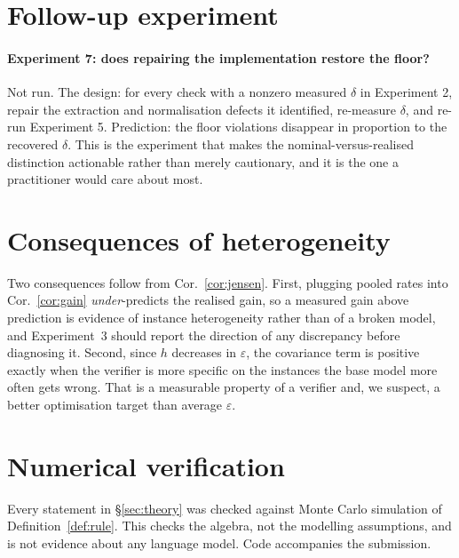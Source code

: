 \documentclass[11pt]{article}
\begin{document}
\section{Follow-up experiment}\label{app:e7}
\paragraph{Experiment 7: does repairing the implementation restore the floor?} Not run. The design: for every check with a nonzero measured $\delta$ in Experiment 2, repair the extraction and normalisation defects it identified, re-measure $\delta$, and re-run Experiment 5. Prediction: the floor violations disappear in proportion to the recovered $\delta$. This is the experiment that makes the nominal-versus-realised distinction actionable rather than merely cautionary, and it is the one a practitioner would care about most.

\section{Consequences of heterogeneity}\label{app:hetdisc}
Two consequences follow from Cor.~\ref{cor:jensen}. First, plugging pooled rates into Cor.~\ref{cor:gain} \emph{under}-predicts the realised gain, so a measured gain above prediction is evidence of instance heterogeneity rather than of a broken model, and Experiment~3 should report the direction of any discrepancy before diagnosing it. Second, since $h$ decreases in $\varepsilon$, the covariance term is positive exactly when the verifier is more specific on the instances the base model more often gets wrong. That is a measurable property of a verifier and, we suspect, a better optimisation target than average $\varepsilon$.

\section{Numerical verification}\label{app:numeric}
Every statement in \S\ref{sec:theory} was checked against Monte Carlo simulation of Definition~\ref{def:rule}. This checks the algebra, not the modelling assumptions, and is not evidence about any language model. Code accompanies the submission.
\end{document}
